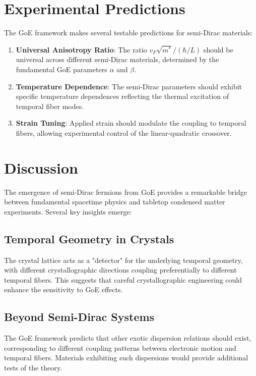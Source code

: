 \documentclass[12pt,a4paper]{article}
\begin{document}
\section{Experimental Predictions}

The GoE framework makes several testable predictions for semi-Dirac materials:

\begin{enumerate}
\item \textbf{Universal Anisotropy Ratio}: The ratio $v_F \sqrt{m^*}/(\hbar/L)$ should be universal across different semi-Dirac materials, determined by the fundamental GoE parameters $\alpha$ and $\beta$.

\item \textbf{Temperature Dependence}: The semi-Dirac parameters should exhibit specific temperature dependences reflecting the thermal excitation of temporal fiber modes.

\item \textbf{Strain Tuning}: Applied strain should modulate the coupling to temporal fibers, allowing experimental control of the linear-quadratic crossover.
\end{enumerate}

\section{Discussion}

The emergence of semi-Dirac fermions from GoE provides a remarkable bridge between fundamental spacetime physics and tabletop condensed matter experiments. Several key insights emerge:

\subsection{Temporal Geometry in Crystals}

The crystal lattice acts as a "detector" for the underlying temporal geometry, with different crystallographic directions coupling preferentially to different temporal fibers. This suggests that careful crystallographic engineering could enhance the sensitivity to GoE effects.

\subsection{Beyond Semi-Dirac Systems}

The GoE framework predicts that other exotic dispersion relations should exist, corresponding to different coupling patterns between electronic motion and temporal fibers. Materials exhibiting such dispersions would provide additional tests of the theory.
\end{document}
